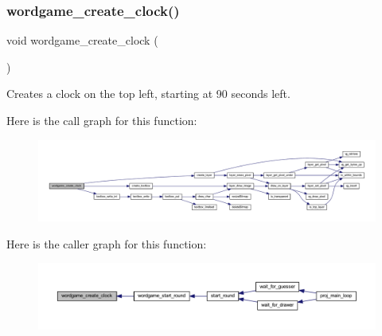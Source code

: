 \mbox{\label{group__wordpicker_ga2ecc68e66d169550aae1f9b6e6548297}} 
\subsubsection{\texorpdfstring{wordgame\+\_\+create\+\_\+clock()}{wordgame\_create\_clock()}}
{\footnotesize\ttfamily void wordgame\+\_\+create\+\_\+clock (\begin{DoxyParamCaption}{ }\end{DoxyParamCaption})}



Creates a clock on the top left, starting at 90 seconds left. 

Here is the call graph for this function\+:\nopagebreak
\begin{figure}[H]
\begin{center}
\leavevmode
\includegraphics[width=350pt]{group__wordpicker_ga2ecc68e66d169550aae1f9b6e6548297_cgraph}
\end{center}
\end{figure}
Here is the caller graph for this function\+:\nopagebreak
\begin{figure}[H]
\begin{center}
\leavevmode
\includegraphics[width=350pt]{group__wordpicker_ga2ecc68e66d169550aae1f9b6e6548297_icgraph}
\end{center}
\end{figure}
\mbox{\label{group__wordpicker_gac613632e3bb4704baaa134a857bb30c2}} 
